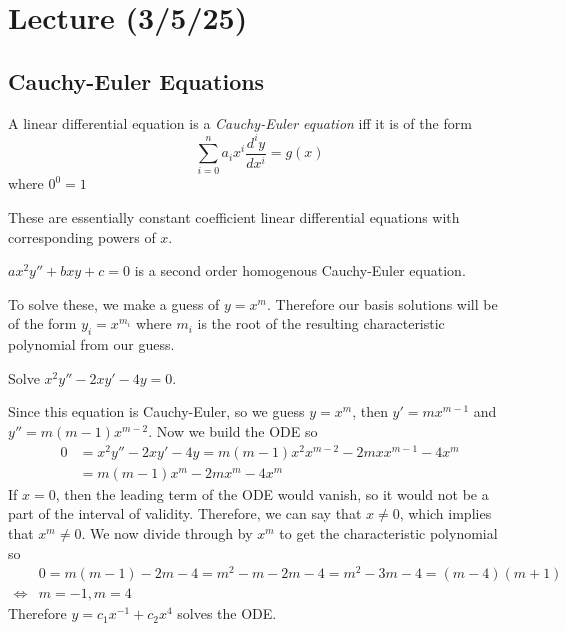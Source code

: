 \documentclass[notes]{subfiles}
\begin{document}
\setcounter{section}{13}
\section{Lecture (3/5/25)}

\subsection{Cauchy-Euler Equations}
\begin{definition}
    A linear differential equation is a \textsl{Cauchy-Euler equation} iff it is of the form
    \[
        \sum_{i = 0}^n a_i x^i \frac{d^i y}{dx^i} = g(x)
    \]
    where $0^0 = 1$
\end{definition}
These are essentially constant coefficient linear differential equations with corresponding powers of $x$.

\begin{example}
    $ax^2 y'' + bxy + c = 0$ is a second order homogenous Cauchy-Euler equation.
\end{example}

To solve these, we make a guess of $y = x^m$. Therefore our basis solutions will be of the form $y_i = x^{m_i}$ where $m_i$ is the root of the resulting characteristic polynomial from our guess.

\begin{exercise}
    Solve $x^2y'' - 2xy' - 4y = 0$.
\end{exercise}
\begin{solution}
    Since this equation is Cauchy-Euler, so we guess $y = x^m$, then $y' = mx^{m - 1}$ and $y'' = m(m - 1)x^{m - 2}$.
    Now we build the ODE so
    \begin{align*}
        0
        &= x^2y'' - 2xy' - 4y
        = m(m - 1)x^2x^{m - 2} - 2mxx^{m - 1} - 4x^m \\
        &= m(m - 1)x^m - 2mx^m - 4x^m
    \end{align*}
    If $x = 0$, then the leading term of the ODE would vanish, so it would not be a part of the interval of validity. Therefore, we can say that $x \neq 0$, which implies that $x^m \neq 0$. We now divide through by $x^m$ to get the characteristic polynomial so
    \begin{align*}
        &0 = m(m - 1) - 2m - 4 = m^2 - m - 2m - 4 = m^2 - 3m - 4 = (m - 4)(m + 1) \\
        \iff& m = -1, m = 4
    \end{align*}
    Therefore $y = c_1x^{-1} + c_2x^4$ solves the ODE.
\end{solution}
\end{document}
